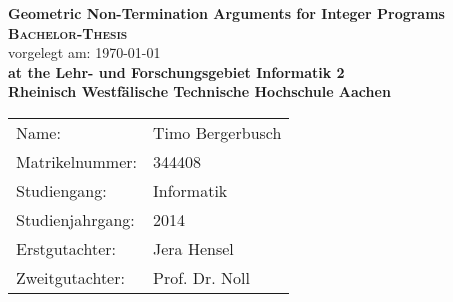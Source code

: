 \begin{titlepage}
	\begin{center}
		\huge \textbf{\textsf{Geometric Non-Termination Arguments for Integer Programs}} \\
		\vspace{2cm}
		\LARGE\textbf{\textsc{Bachelor-Thesis}}\\
		\vspace{1cm}
		\normalsize
		vorgelegt am: \today \\
		\vspace{2.5cm}
		\large \textbf{at the Lehr- und Forschungsgebiet Informatik 2}\\
		\large \textbf{Rheinisch Westfälische Technische Hochschule Aachen}\\
		\vspace{3cm}
	\end{center}
	\normalsize{
		\begin{tabular}{ll}
			Name: & {Timo Bergerbusch} \\
			Matrikelnummer: & {344408} \\
			Studiengang: & Informatik\\
			Studienjahrgang: & 2014\\
			Erstgutachter: & {Jera Hensel} \\
			Zweitgutachter: & {Prof. Dr. Noll} \\
		\end{tabular}\\
	}
\end{titlepage}